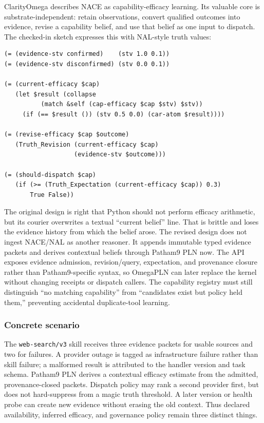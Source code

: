 \documentclass[11pt]{article}
\begin{document}
ClarityOmega describes NACE as capability-efficacy learning.  Its valuable core
is substrate-independent: retain observations, convert qualified outcomes into
evidence, revise a capability belief, and use that belief as one input to
dispatch.  The checked-in sketch expresses this with NAL-style truth values:

\begin{lstlisting}
(= (evidence-stv confirmed)    (stv 1.0 0.1))
(= (evidence-stv disconfirmed) (stv 0.0 0.1))

(= (current-efficacy $cap)
   (let $result (collapse
          (match &self (cap-efficacy $cap $stv) $stv))
     (if (== $result ()) (stv 0.5 0.0) (car-atom $result))))

(= (revise-efficacy $cap $outcome)
   (Truth_Revision (current-efficacy $cap)
                   (evidence-stv $outcome)))

(= (should-dispatch $cap)
   (if (>= (Truth_Expectation (current-efficacy $cap)) 0.3)
       True False))
\end{lstlisting}

The original design is right that Python should not perform efficacy arithmetic,
but its courier overwrites a textual ``current belief'' line.  That is brittle
and loses the evidence history from which the belief arose.  The revised design
does not ingest NACE/NAL as another reasoner.  It appends immutable typed evidence
packets and derives contextual beliefs through Patham9 PLN now.  The API exposes
evidence admission, revision/query, expectation, and provenance closure rather
than Patham9-specific syntax, so OmegaPLN can later replace the kernel without
changing receipts or dispatch callers.  The capability registry must still
distinguish ``no matching capability'' from ``candidates exist but policy held
them,'' preventing accidental duplicate-tool learning.

\subsubsection{Concrete scenario}

The \texttt{web-search/v3} skill receives three evidence packets for usable
sources and two for failures.  A provider outage is tagged as infrastructure
failure rather than skill failure; a malformed result is attributed to the
handler version and task schema.  Patham9 PLN derives a contextual efficacy
estimate from the admitted, provenance-closed packets.  Dispatch policy may rank
a second provider first, but does not hard-suppress from a magic truth threshold.
A later version or health probe can create new evidence without erasing the old
context.  Thus declared availability, inferred efficacy, and governance policy
remain three distinct things.
\end{document}

